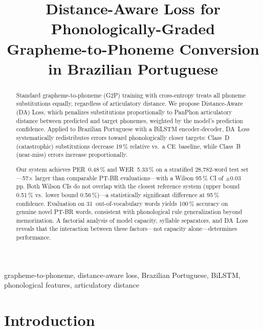 \documentclass[conference]{IEEEtran}
\begin{document}

\title{Distance-Aware Loss for Phonologically-Graded\\
       Grapheme-to-Phoneme Conversion in Brazilian Portuguese}

\author{%
  \IEEEauthorblockN{[ANONYMOUS]}
  \IEEEauthorblockA{[ANONYMOUS]}
}

\maketitle

\begin{abstract}
Standard grapheme-to-phoneme (G2P) training with cross-entropy
treats all phoneme substitutions equally, regardless of articulatory
distance.
We propose Distance-Aware (DA) Loss, which penalizes substitutions
proportionally to PanPhon articulatory distance between predicted and
target phonemes, weighted by the model's prediction confidence.
Applied to Brazilian Portuguese with a BiLSTM encoder-decoder,
DA~Loss systematically redistributes errors toward phonologically
closer targets: Class~D (catastrophic) substitutions decrease
19\,\% relative vs.\ a CE~baseline, while Class~B (near-miss)
errors increase proportionally.

Our system achieves PER~0.48\,\% and WER~5.33\,\% on a stratified
28{,}782-word test set---57$\times$ larger than comparable PT-BR
evaluations---with a Wilson 95\,\% CI of $\pm$0.03\,pp.
Both Wilson CIs do not overlap with the closest reference system
(upper bound 0.51\,\% vs.\ lower bound 0.56\,\%)---a statistically
significant difference at 95\,\% confidence.
Evaluation on 31~out-of-vocabulary words yields 100\,\% accuracy
on genuine novel PT-BR words, consistent with phonological rule
generalization beyond memorization.
A factorial analysis of model capacity, syllable separators, and
DA~Loss reveals that the interaction between these factors---not
capacity alone---determines performance.
\end{abstract}

\begin{IEEEkeywords}
grapheme-to-phoneme, distance-aware loss, Brazilian Portuguese,
BiLSTM, phonological features, articulatory distance
\end{IEEEkeywords}

\section{Introduction}
\end{document}
